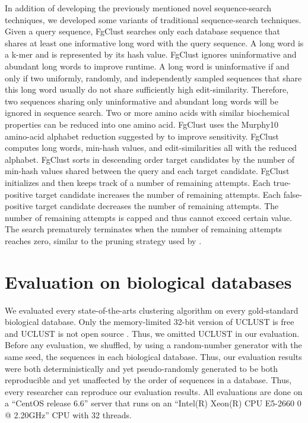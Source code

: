 \documentclass[11pt,letterpaper]{article}
\begin{document}
In addition of developing the previously mentioned novel sequence-search techniques, we developed some variants of traditional sequence-search techniques.
Given a query sequence, FgClust searches only each database sequence that shares at least one informative long word with the query sequence.
A long word is a k-mer and is represented by its hash value.
FgClust ignores uninformative and abundant long words to improve runtime.
A long word is uninformative if and only if two uniformly, randomly, and independently sampled sequences that share this long word usually do not share sufficiently high edit-similarity.
Therefore, two sequences sharing only uninformative and abundant long words will be ignored in sequence search.
Two or more amino acids with similar biochemical properties can be reduced into one amino acid.
FgClust uses the Murphy10 amino-acid alphabet reduction suggested by \citet{murphy2000simplified} to improve sensitivity.
FgClust computes long words, min-hash values, and edit-similarities all with the reduced alphabet.
FgClust sorts in descending order target candidates by the number of min-hash values shared between the query and each target candidate.
FgClust initializes and then keeps track of a number of remaining attempts.
Each true-positive  target candidate increases the number of remaining attempts.
Each false-positive target candidate decreases the number of remaining attempts.
The number of remaining attempts is capped and thus cannot exceed certain value.
The search prematurely terminates when the number of remaining attempts reaches zero, similar to the pruning strategy used by \citet{edgar2010search}.

\section{Evaluation on biological databases}

We evaluated every state-of-the-arts clustering algorithm on every gold-standard biological database.
Only the memory-limited 32-bit version of UCLUST is free and UCLUST is not open source \citep{edgar2010search}.
Thus, we omitted UCLUST in our evaluation.
Before any evaluation, we shuffled, by using a random-number generator with the same seed, the sequences in each biological database.
Thus, our evaluation results were both deterministically and yet pseudo-randomly generated to be both reproducible and yet unaffected by the order of sequences in a database.
Thus, every researcher can reproduce our evaluation results.
All evaluations are done on a ``CentOS release 6.6'' server that runs on an ``Intel(R) Xeon(R) CPU E5-2660 0 @ 2.20GHz'' CPU with 32 threads.
\end{document}
